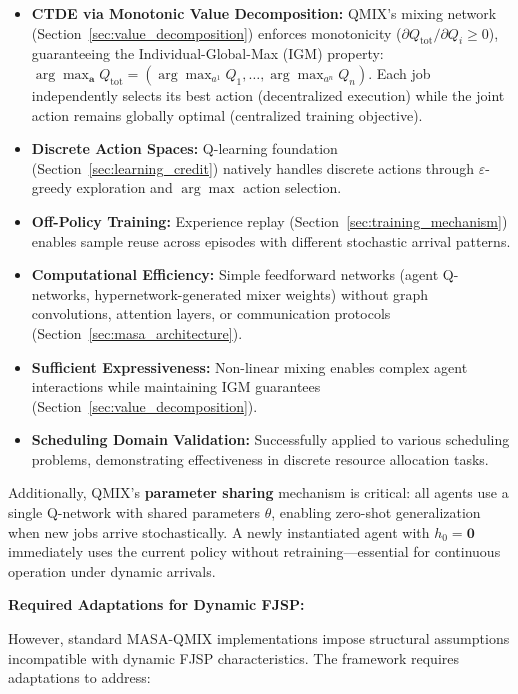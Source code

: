 \begin{itemize}
\item \textbf{CTDE via Monotonic Value Decomposition:} QMIX's mixing network (Section~\ref{sec:value_decomposition}) enforces monotonicity (\( \partial Q_{\text{tot}} / \partial Q_i \geq 0 \)), guaranteeing the Individual-Global-Max (IGM) property: \( \arg\max_{\mathbf{a}} Q_{\text{tot}} = (\arg\max_{a^1} Q_1, \ldots, \arg\max_{a^n} Q_n) \). Each job independently selects its best action (decentralized execution) while the joint action remains globally optimal (centralized training objective).

\item \textbf{Discrete Action Spaces:} Q-learning foundation (Section~\ref{sec:learning_credit}) natively handles discrete actions through \( \varepsilon \)-greedy exploration and \( \arg\max \) action selection.

\item \textbf{Off-Policy Training:} Experience replay (Section~\ref{sec:training_mechanism}) enables sample reuse across episodes with different stochastic arrival patterns.

\item \textbf{Computational Efficiency:} Simple feedforward networks (agent Q-networks, hypernetwork-generated mixer weights) without graph convolutions, attention layers, or communication protocols (Section~\ref{sec:masa_architecture}).

\item \textbf{Sufficient Expressiveness:} Non-linear mixing enables complex agent interactions while maintaining IGM guarantees (Section~\ref{sec:value_decomposition}).

\item \textbf{Scheduling Domain Validation:} Successfully applied to various scheduling problems, demonstrating effectiveness in discrete resource allocation tasks.
\end{itemize}

Additionally, QMIX's \textbf{parameter sharing} mechanism is critical: all agents use a single Q-network with shared parameters \( \theta \), enabling zero-shot generalization when new jobs arrive stochastically. A newly instantiated agent with \( h_0 = \mathbf{0} \) immediately uses the current policy without retraining—essential for continuous operation under dynamic arrivals.

\textbf{Required Adaptations for Dynamic FJSP:}

However, standard MASA-QMIX implementations impose structural assumptions incompatible with dynamic FJSP characteristics. The framework requires adaptations to address:

